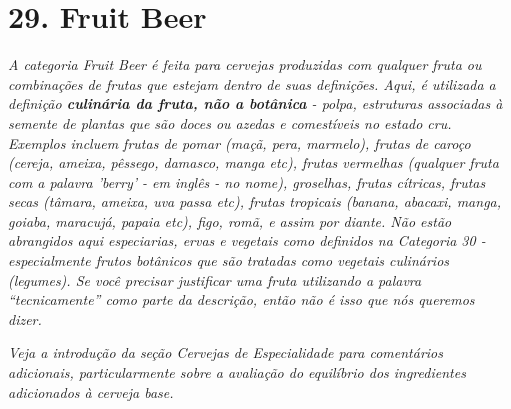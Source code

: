 \section*{29. Fruit Beer}
\textit{A categoria Fruit Beer é feita para cervejas produzidas com qualquer fruta ou combinações de frutas que estejam dentro de suas definições. Aqui, é utilizada a definição \textbf{culinária da fruta, não a botânica} - polpa, estruturas associadas à semente de plantas que são doces ou azedas e comestíveis no estado cru. Exemplos incluem frutas de pomar (maçã, pera, marmelo), frutas de caroço (cereja, ameixa, pêssego, damasco, manga etc), frutas vermelhas (qualquer fruta com a palavra 'berry' - em inglês - no nome), groselhas, frutas cítricas, frutas secas (tâmara, ameixa, uva passa etc), frutas tropicais (banana, abacaxi, manga, goiaba, maracujá, papaia etc), figo, romã, e assim por diante. Não estão abrangidos aqui especiarias, ervas e vegetais como definidos na Categoria 30 - especialmente frutos botânicos que são tratadas como vegetais culinários (legumes). Se você precisar justificar uma fruta utilizando a palavra “tecnicamente” como parte da descrição, então não é isso que nós queremos dizer.}

\textit{Veja a introdução da seção Cervejas de Especialidade para comentários adicionais, particularmente sobre a avaliação do equilíbrio dos ingredientes adicionados à cerveja base.}
